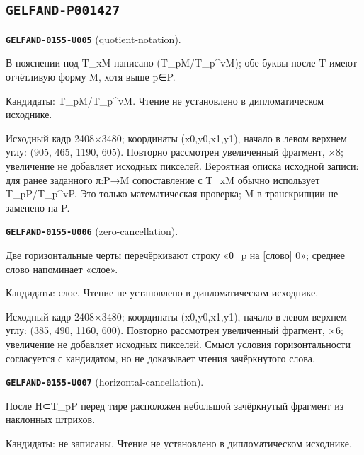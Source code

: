\subsection*{\texttt{GELFAND-P001427}}
\par\noindent\leavevmode{}\label{GELFAND-0155-U005}\label{GELFAND-P001427:quotient-notation}\textbf{\texttt{GELFAND-0155-U005}} (quotient-notation).\nopagebreak[4]\par
В пояснении под T\_xM написано (T\_pM/T\_p\textasciicircum{}vM); обе буквы после T имеют отчётливую форму M, хотя выше p∈P.\par
Кандидаты: T\_pM/T\_p\textasciicircum{}vM. Чтение не установлено в дипломатическом исходнике.\par
Исходный кадр 2408×3480; координаты (x0,y0,x1,y1), начало в левом верхнем углу: (905, 465, 1190, 605). Повторно рассмотрен увеличенный фрагмент, ×8; увеличение не добавляет исходных пикселей. Вероятная описка исходной записи: для ранее заданного π:P→M сопоставление с T\_xM обычно использует T\_pP/T\_p\textasciicircum{}vP. Это только математическая проверка; M в транскрипции не заменено на P.\par
\medskip
\par\noindent\leavevmode{}\label{GELFAND-0155-U006}\label{GELFAND-P001427:zero-cancellation}\textbf{\texttt{GELFAND-0155-U006}} (zero-cancellation).\nopagebreak[4]\par
Две горизонтальные черты перечёркивают строку «θ\_p на [слово] 0»; среднее слово напоминает «слое».\par
Кандидаты: слое. Чтение не установлено в дипломатическом исходнике.\par
Исходный кадр 2408×3480; координаты (x0,y0,x1,y1), начало в левом верхнем углу: (385, 490, 1160, 600). Повторно рассмотрен увеличенный фрагмент, ×6; увеличение не добавляет исходных пикселей. Смысл условия горизонтальности согласуется с кандидатом, но не доказывает чтения зачёркнутого слова.\par
\medskip
\par\noindent\leavevmode{}\label{GELFAND-0155-U007}\label{GELFAND-P001427:horizontal-cancellation}\textbf{\texttt{GELFAND-0155-U007}} (horizontal-cancellation).\nopagebreak[4]\par
После H⊂T\_pP перед тире расположен небольшой зачёркнутый фрагмент из наклонных штрихов.\par
Кандидаты: не записаны. Чтение не установлено в дипломатическом исходнике.\par
